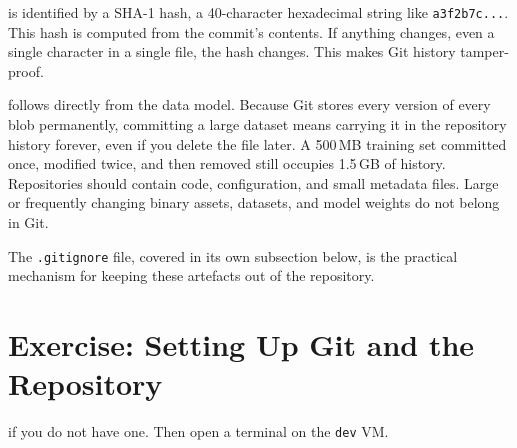  is identified by a SHA-1 hash, a 40-character hexadecimal string like
\texttt{a3f2b7c...}. This hash is computed from the commit's contents. If anything changes, even a single
character in a single file, the hash changes. This makes Git history tamper-proof.

 follows directly from the data model.
Because Git stores every version of every blob permanently, committing a large dataset
means carrying it in the repository history forever, even if you delete the file later.
A 500\,MB training set committed once, modified twice, and then removed still occupies 1.5\,GB of history.
Repositories should contain code, configuration, and small metadata files.
Large or frequently changing binary assets, datasets, and model weights do not belong in Git.


\vspace{1.5em}
The \texttt{.gitignore} file, covered in its own subsection below, is the practical mechanism
for keeping these artefacts out of the repository.





\newpage
\section{Exercise: Setting Up Git and the Repository}


 if you do not have one. Then open a terminal on the \texttt{dev} VM.

